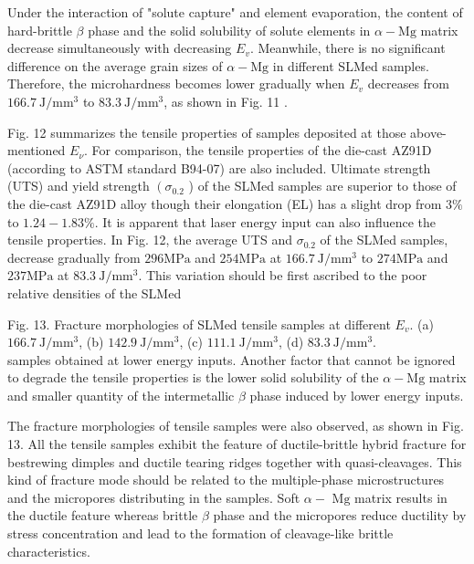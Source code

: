 \documentclass[10pt]{article}
\begin{document}
Under the interaction of "solute capture" and element evaporation, the content of hard-brittle $\beta$ phase and the solid solubility of solute elements in $\alpha-\mathrm{Mg}$ matrix decrease simultaneously with decreasing $E_{v}$. Meanwhile, there is no significant difference on the average grain sizes of $\alpha-\mathrm{Mg}$ in different SLMed samples. Therefore, the microhardness becomes lower gradually when $E_{v}$ decreases from $166.7 \mathrm{~J} / \mathrm{mm}^{3}$ to $83.3 \mathrm{~J} / \mathrm{mm}^{3}$, as shown in Fig. 11 .

Fig. 12 summarizes the tensile properties of samples deposited at those above-mentioned $E_{\nu}$. For comparison, the tensile properties of the die-cast AZ91D (according to ASTM standard B94-07) are also included. Ultimate strength (UTS) and yield strength $\left(\sigma_{0.2}\right.$ ) of the SLMed samples are superior to those of the die-cast AZ91D alloy though their elongation (EL) has a slight drop from $3 \%$ to $1.24-1.83 \%$. It is apparent that laser energy input can also influence the tensile properties. In Fig. 12, the average UTS and $\sigma_{0.2}$ of the SLMed samples, decrease gradually from $296 \mathrm{MPa}$ and $254 \mathrm{MPa}$ at $166.7 \mathrm{~J} / \mathrm{mm}^{3}$ to $274 \mathrm{MPa}$ and $237 \mathrm{MPa}$ at $83.3 \mathrm{~J} / \mathrm{mm}^{3}$. This variation should be first ascribed to the poor relative densities of the SLMed

Fig. 13. Fracture morphologies of SLMed tensile samples at different $E_{v}$. (a) $166.7 \mathrm{~J} / \mathrm{mm}^{3}$, (b) $142.9 \mathrm{~J} / \mathrm{mm}^{3}$, (c) $111.1 \mathrm{~J} / \mathrm{mm}^{3}$, (d) $83.3 \mathrm{~J} / \mathrm{mm}^{3}$.\\
samples obtained at lower energy inputs. Another factor that cannot be ignored to degrade the tensile properties is the lower solid solubility of the $\alpha-\mathrm{Mg}$ matrix and smaller quantity of the intermetallic $\beta$ phase induced by lower energy inputs.

The fracture morphologies of tensile samples were also observed, as shown in Fig. 13. All the tensile samples exhibit the feature of ductile-brittle hybrid fracture for bestrewing dimples and ductile tearing ridges together with quasi-cleavages. This kind of fracture mode should be related to the multiple-phase microstructures and the micropores distributing in the samples. Soft $\alpha-$ $\mathrm{Mg}$ matrix results in the ductile feature whereas brittle $\beta$ phase and the micropores reduce ductility by stress concentration and lead to the formation of cleavage-like brittle characteristics.
\end{document}
